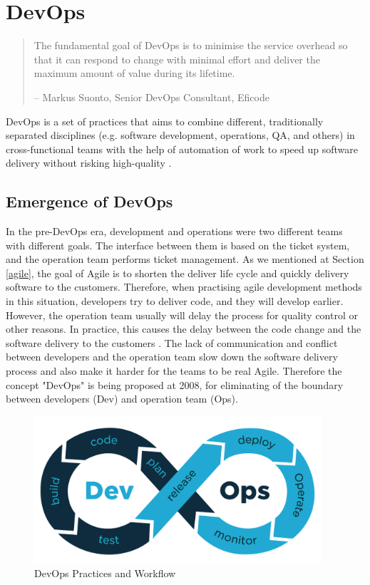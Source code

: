 \section{DevOps}
\begin{quotation}
    The fundamental goal of DevOps is to minimise the service overhead so that it can respond to change with minimal effort and deliver the maximum amount of value during its lifetime.
    \begin{flushright}
        -- Markus Suonto, Senior DevOps Consultant, Eficode
    \end{flushright}
\end{quotation}
\label{devops}
DevOps is a set of practices that aims to combine different, traditionally separated disciplines (e.g. software development, operations, QA, and others) in cross-functional teams with the help of automation of work to speed up software delivery without risking high-quality \cite{bass2015devops}.
\subsection{Emergence of DevOps}
In the pre-DevOps era, development and operations were two different teams with different goals. The interface between them is based on the ticket system, and the operation team performs ticket management. As we mentioned at Section \ref{agile}, the goal of Agile is to shorten the deliver life cycle and quickly delivery software to the customers. Therefore, when practising agile development methods in this situation, developers try to deliver code, and they will develop earlier.
However, the operation team usually will delay the process for quality control or other reasons. In practice, this causes the delay between the code change and the software delivery to the customers \cite{leite2019survey}. The lack of communication and conflict between developers and the operation team slow down the software delivery process and also make it harder for the teams to be real Agile. Therefore the concept "DevOps" is being proposed at 2008, for eliminating of the boundary between developers (Dev) and operation team (Ops).
\begin{figure}[h]
    \centering
    \includegraphics[width=0.95\textwidth]{pics/DevOps.png}
    \caption{DevOps Practices and Workflow \cite{DevOpsin72:online}}
    \label{fig:DevOps}
\end{figure}
